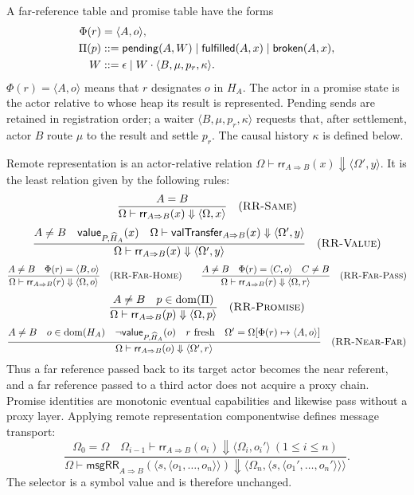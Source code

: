 A far-reference table and promise table have the forms
\begin{equation}\label{eq:eventual-tables}
\begin{aligned}
 \Phi(r)&=\langle A,o\rangle,\\
 \Pi(p)&::=\mathsf{pending}(A,W)
       \mid\mathsf{fulfilled}(A,x)\mid\mathsf{broken}(A,x),\\
 W&::=\epsilon\mid W\mathbin{\cdot}
       \langle B,\mu,p_r,\kappa\rangle.
\end{aligned}
\end{equation}
$\Phi(r)=\langle A,o\rangle$ means that $r$ designates $o$ in $H_A$.
The actor in a promise state is the actor relative to whose heap its result is
represented.  Pending sends are retained in registration order; a waiter
$\langle B,\mu,p_r,\kappa\rangle$ requests that, after settlement, actor $B$
route $\mu$ to the result and settle $p_r$.  The causal history $\kappa$ is
defined below.

Remote representation is an actor-relative relation
$\Omega\vdash\mathsf{rr}_{A\Rightarrow B}(x)
\Downarrow\langle\Omega',y\rangle$.  It is the least relation given by the
following rules:
\[
\dfrac{A=B}
 {\Omega\vdash\mathsf{rr}_{A\Rightarrow B}(x)
   \Downarrow\langle\Omega,x\rangle}
\quad(\textsc{RR-Same})
\]
\[
\dfrac{A\ne B\quad \mathsf{value}_{P,\widehat H_A}(x)\quad
       \Omega\vdash\mathsf{valTransfer}_{A\Rightarrow B}(x)
         \Downarrow\langle\Omega',y\rangle}
 {\Omega\vdash\mathsf{rr}_{A\Rightarrow B}(x)
   \Downarrow\langle\Omega',y\rangle}
\quad(\textsc{RR-Value})
\]
\[
\dfrac{A\ne B\quad \Phi(r)=\langle B,o\rangle}
 {\Omega\vdash\mathsf{rr}_{A\Rightarrow B}(r)
   \Downarrow\langle\Omega,o\rangle}
\quad(\textsc{RR-Far-Home})
\qquad
\dfrac{A\ne B\quad \Phi(r)=\langle C,o\rangle\quad C\ne B}
 {\Omega\vdash\mathsf{rr}_{A\Rightarrow B}(r)
   \Downarrow\langle\Omega,r\rangle}
\quad(\textsc{RR-Far-Pass})
\]
\[
\dfrac{A\ne B\quad p\in\mathop{\mathrm{dom}}(\Pi)}
 {\Omega\vdash\mathsf{rr}_{A\Rightarrow B}(p)
   \Downarrow\langle\Omega,p\rangle}
\quad(\textsc{RR-Promise})
\]
\[
\dfrac{A\ne B\quad o\in\mathop{\mathrm{dom}}(H_A)\quad
       \neg\mathsf{value}_{P,\widehat H_A}(o)\quad r\text{ fresh}\quad
       \Omega'=\Omega[\Phi(r)\mapsto\langle A,o\rangle]}
 {\Omega\vdash\mathsf{rr}_{A\Rightarrow B}(o)
   \Downarrow\langle\Omega',r\rangle}
\quad(\textsc{RR-Near-Far})
\]
Thus a far reference passed back to its target actor becomes the near referent,
and a far reference passed to a third actor does not acquire a proxy chain.
Promise identities are monotonic eventual capabilities and likewise pass
without a proxy layer.  Applying remote representation componentwise defines
message transport:
\begin{equation}\label{eq:message-transfer}
 \dfrac{\Omega_0=\Omega\quad
   \Omega_{i-1}\vdash\mathsf{rr}_{A\Rightarrow B}(o_i)
      \Downarrow\langle\Omega_i,o_i'\rangle\ (1\le i\le n)}
 {\Omega\vdash\mathsf{msgRR}_{A\Rightarrow B}
      (\langle s,\langle o_1,\ldots,o_n\rangle\rangle)
   \Downarrow
      \langle\Omega_n,\langle s,\langle o_1',\ldots,o_n'\rangle\rangle\rangle}.
\end{equation}
The selector is a symbol value and is therefore unchanged.

